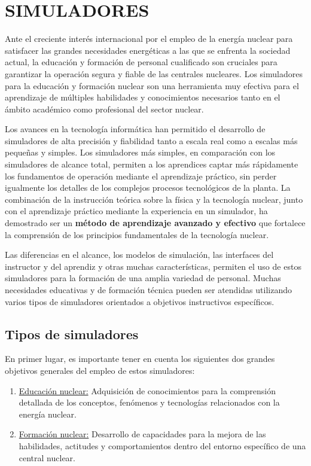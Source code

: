 \newpage
\section{SIMULADORES} \label{simuladores}

Ante el creciente interés internacional por el empleo de la energía nuclear para satisfacer las grandes necesidades energéticas a las que se enfrenta la sociedad actual, la educación y formación de personal cualificado son cruciales para garantizar la operación segura y fiable de las centrales nucleares. Los simuladores para la educación y formación nuclear son una herramienta muy efectiva para el aprendizaje de múltiples habilidades y conocimientos necesarios tanto en el ámbito académico como profesional del sector nuclear.

Los avances en la tecnología informática han permitido el desarrollo de simuladores de alta precisión y fiabilidad tanto a escala real como a escalas más pequeñas y simples. Los simuladores más simples, en comparación con los simuladores de alcance total, permiten a los aprendices captar más rápidamente los fundamentos de operación mediante el aprendizaje práctico, sin perder igualmente los detalles de los complejos procesos tecnológicos de la planta. La combinación de la instrucción teórica sobre la física y la tecnología nuclear, junto con el aprendizaje práctico mediante la experiencia en un simulador, ha demostrado ser un \textbf{método de aprendizaje avanzado y efectivo} que fortalece la comprensión de los principios fundamentales de la tecnología nuclear. 

Las diferencias en el alcance, los modelos de simulación, las interfaces del instructor y del aprendiz y otras muchas características, permiten el uso de estos simuladores para la formación de una amplia variedad de personal. Muchas necesidades educativas y de formación técnica pueden ser atendidas utilizando varios tipos de simuladores orientados a objetivos instructivos específicos.

\subsection{Tipos de simuladores}

En primer lugar, es importante tener en cuenta los siguientes dos grandes objetivos generales del empleo de estos simuladores:

\begin{enumerate}
  \item \underline{Educación nuclear:} Adquisición de conocimientos para la comprensión detallada de los conceptos, fenómenos y tecnologías relacionados con la energía nuclear.
  \item \underline{Formación nuclear:} Desarrollo de capacidades para la mejora de las habilidades, actitudes y comportamientos dentro del entorno específico de una central nuclear.
\end{enumerate}

